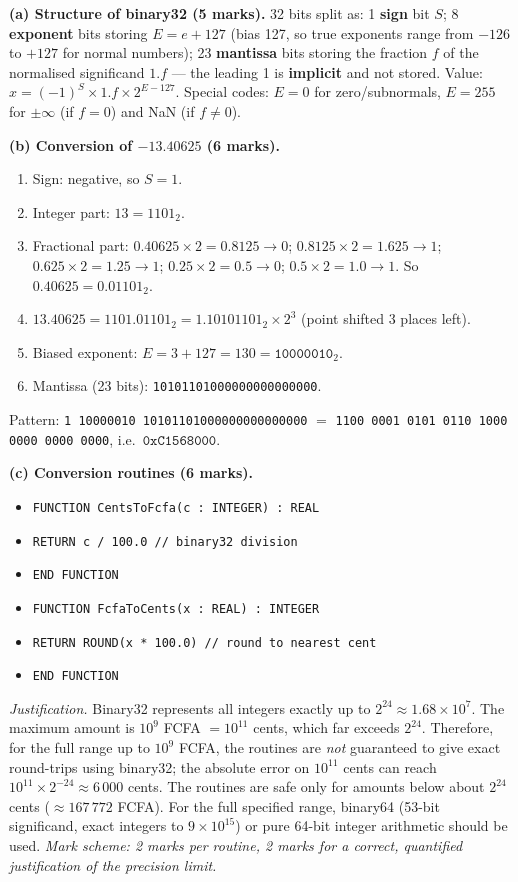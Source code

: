 \documentclass[11pt]{article}
\newcommand{\cle}[1]{{\popxbold\color{popdark}#1}}
\begin{document}
\begin{corrige}
\textbf{(a) Structure of binary32 (5 marks).} 32 bits split as: 1 \textbf{sign} bit $S$; 8 \textbf{exponent} bits storing $E = e + 127$ (bias 127, so true exponents range from $-126$ to $+127$ for normal numbers); 23 \textbf{mantissa} bits storing the fraction $f$ of the normalised significand $1.f$ — the leading 1 is \textbf{implicit} and not stored. Value: $x = (-1)^{S}\times 1.f\times 2^{E-127}$. Special codes: $E = 0$ for zero/subnormals, $E = 255$ for $\pm\infty$ (if $f=0$) and NaN (if $f\neq 0$).

\textbf{(b) Conversion of $-13.40625$ (6 marks).}
\begin{enumerate}
\item Sign: negative, so $S = 1$.
\item Integer part: $13 = 1101_2$.
\item Fractional part: $0.40625\times 2 = 0.8125 \to 0$; $0.8125\times 2 = 1.625 \to 1$; $0.625\times 2 = 1.25 \to 1$; $0.25\times 2 = 0.5 \to 0$; $0.5\times 2 = 1.0 \to 1$. So $0.40625 = 0.01101_2$.
\item $13.40625 = 1101.01101_2 = 1.10101101_2\times 2^{3}$ (point shifted 3 places left).
\item Biased exponent: $E = 3 + 127 = 130 = \texttt{10000010}_2$.
\item Mantissa (23 bits): \texttt{10101101000000000000000}.
\end{enumerate}
Pattern: \texttt{1\ 10000010\ 10101101000000000000000} $=$ \texttt{1100 0001 0101 0110 1000 0000 0000 0000}, i.e.\ $\boxed{\texttt{0xC1568000}}$.

\textbf{(c) Conversion routines (6 marks).}
\begin{itemize}
\item[] \texttt{FUNCTION CentsToFcfa(c : INTEGER) : REAL}
\item[] \texttt{\quad RETURN c / 100.0 \quad // binary32 division}
\item[] \texttt{END FUNCTION}
\item[] \texttt{FUNCTION FcfaToCents(x : REAL) : INTEGER}
\item[] \texttt{\quad RETURN ROUND(x * 100.0) \quad // round to nearest cent}
\item[] \texttt{END FUNCTION}
\end{itemize}
\emph{Justification.} Binary32 represents all integers exactly up to $2^{24} \approx 1.68\times 10^{7}$. The maximum amount is $10^{9}$ FCFA $= 10^{11}$ cents, which far exceeds $2^{24}$. Therefore, for the full range up to $10^{9}$ FCFA, the routines are \emph{not} guaranteed to give exact round-trips using binary32; the absolute error on $10^{11}$ cents can reach $10^{11}\times 2^{-24} \approx 6\,000$ cents. The routines are safe only for amounts below about $2^{24}$ cents ($\approx 167\,772$ FCFA). For the full specified range, \cle{binary64} (53-bit significand, exact integers to $9\times 10^{15}$) or pure 64-bit integer arithmetic should be used. \emph{Mark scheme: 2 marks per routine, 2 marks for a correct, quantified justification of the precision limit.}


\end{corrige}
\end{document}
